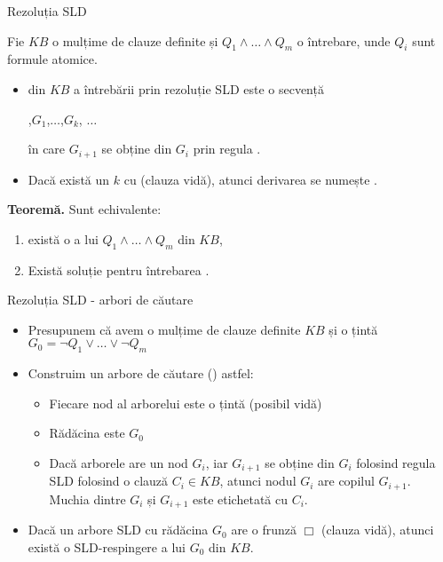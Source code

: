 \documentclass[xcolor=pdftex,romanian,colorlinks]{beamer}
\begin{document}
\begin{frame}{Rezoluția SLD }
 
Fie $KB$ o mulțime de clauze definite și $Q_1 \wedge \ldots \wedge Q_m$ o întrebare, unde $Q_i$ sunt formule atomice.

\begin{itemize}
  \item {} din $KB$ a întrebării prin rezoluție SLD este o secvență 
\begin{center}
,\quad  $G_1$,\quad $\ldots$,\quad $G_k$, $\ldots$
\end{center}
în care $G_{i+1}$ se obține din $G_i$ prin regula .  

  \item Dacă există un $k$ cu 
 (clauza vidă), atunci  derivarea se numește .
\end{itemize}

\pause
\textbf{Teoremă.} Sunt echivalente:
\begin{enumerate}
\item există o  a lui $Q_1 \wedge \ldots \wedge Q_m$ din  $KB$,
\vspace{.2cm}
\item  Există soluție pentru întrebarea .
\end{enumerate}
\end{frame}


\begin{frame}{Rezoluția SLD - arbori de căutare}
 \begin{itemize}
   \item Presupunem că avem o mulțime de clauze definite $KB$ și o țintă $G_0 = \neg Q_1 \vee \ldots \vee \neg Q_m$
  \medskip
  \item Construim un arbore de căutare () astfel:
  \begin{itemize}
    \vspace{.1cm}
    \item Fiecare nod al arborelui este o țintă (posibil vidă)
    \vspace{.1cm}
    \item Rădăcina este $G_0$
    \vspace{.1cm}
    \item Dacă arborele are un nod $G_i$, iar $G_{i+1}$ se obține din $G_i$ folosind regula SLD folosind o clauză $C_i \in KB$, atunci nodul  $G_i$ are copilul $G_{i+1}$. \\
    Muchia dintre $G_i$ și $G_{i+1}$ este etichetată cu $C_i$.
  \end{itemize}
  \medskip
  \item Dacă un arbore SLD cu rădăcina $G_0$ are o frunză $\Box$ (clauza vidă), atunci există o SLD-respingere a lui $G_0$ din $KB$.
\end{itemize}
\end{frame}
\end{document}
